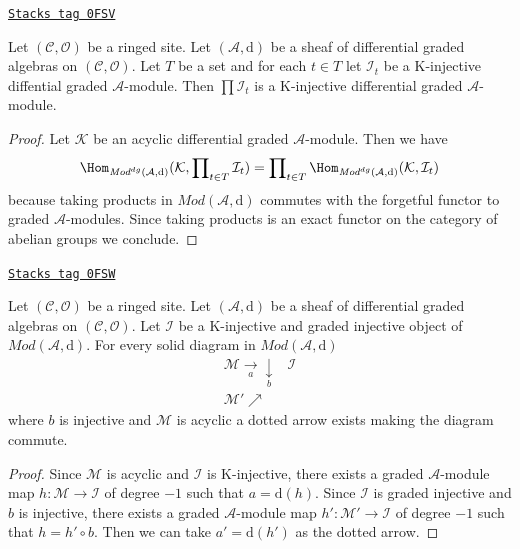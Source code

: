 \begin{lemma}
\label{sdga-lemma-product-K-injective}
\href{https://stacks.math.columbia.edu/tag/0FSV}{\texttt{Stacks tag 0FSV}}

Let $(\mathcal{C}, \mathcal{O})$ be a ringed site.
Let $(\mathcal{A}, \text{d})$ be a sheaf of differential graded algebras
on $(\mathcal{C}, \mathcal{O})$. Let $T$ be a set and for
each $t \in T$ let $\mathcal{I}_t$ be a K-injective
diffential graded $\mathcal{A}$-module. Then
$\prod \mathcal{I}_t$ is a K-injective differential
graded $\mathcal{A}$-module.
\end{lemma}

\begin{proof}
Let $\mathcal{K}$ be an acyclic differential graded $\mathcal{A}$-module.
Then we have
$$
\Hom_{\textit{Mod}^{dg}(\mathcal{A}, \text{d})}(\mathcal{K},
\prod\nolimits_{t \in T} \mathcal{I}_t)
=
\prod\nolimits_{t \in T}
\Hom_{\textit{Mod}^{dg}(\mathcal{A}, \text{d})}(\mathcal{K}, \mathcal{I}_t)
$$
because taking products in $\textit{Mod}(\mathcal{A}, \text{d})$
commutes with the forgetful functor to graded $\mathcal{A}$-modules.
Since taking products is an exact functor on the category of abelian groups
we conclude.
\end{proof}

\begin{lemma}
\label{sdga-lemma-first-property-dg-injective}
\href{https://stacks.math.columbia.edu/tag/0FSW}{\texttt{Stacks tag 0FSW}}

Let $(\mathcal{C}, \mathcal{O})$ be a ringed site.
Let $(\mathcal{A}, \text{d})$
be a sheaf of differential graded algebras on $(\mathcal{C}, \mathcal{O})$.
Let $\mathcal{I}$ be a K-injective and graded injective
object of $\textit{Mod}(\mathcal{A}, \text{d})$.
For every solid diagram in $\textit{Mod}(\mathcal{A}, \text{d})$
$$
\begin{array}{cc}\mathcal{M} \underset{a}{\longrightarrow}\underset{b}{\downarrow} & \mathcal{I} \\ \mathcal{M}' \nearrow & \end{array}
$$
where $b$ is injective and $\mathcal{M}$ is acyclic
a dotted arrow exists making the diagram commute.
\end{lemma}

\begin{proof}
Since $\mathcal{M}$ is acyclic and $\mathcal{I}$ is K-injective,
there exists a graded $\mathcal{A}$-module map
$h : \mathcal{M} \to \mathcal{I}$ of degree $-1$
such that $a = \text{d}(h)$. Since $\mathcal{I}$ is graded injective
and $b$ is injective, there exists a graded $\mathcal{A}$-module
map $h' : \mathcal{M}' \to \mathcal{I}$ of degree $-1$
such that $h = h' \circ b$. Then we can take $a' = \text{d}(h')$
as the dotted arrow.
\end{proof}

